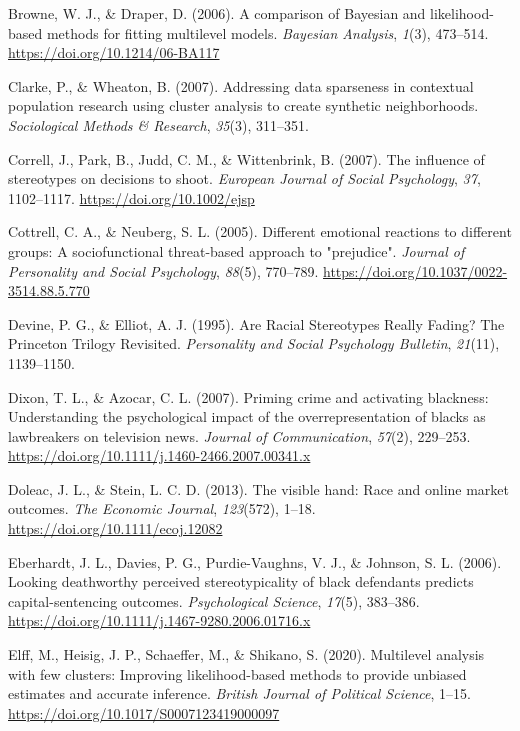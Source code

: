\documentclass[
  english,
  man]{apa6}
\begin{document}
\leavevmode\hypertarget{ref-Browne2006}{}%
Browne, W. J., \& Draper, D. (2006). A comparison of Bayesian and likelihood-based methods for fitting multilevel models. \emph{Bayesian Analysis}, \emph{1}(3), 473--514. \url{https://doi.org/10.1214/06-BA117}

\leavevmode\hypertarget{ref-Clarke2007}{}%
Clarke, P., \& Wheaton, B. (2007). Addressing data sparseness in contextual population research using cluster analysis to create synthetic neighborhoods. \emph{Sociological Methods \& Research}, \emph{35}(3), 311--351.

\leavevmode\hypertarget{ref-Correll2007}{}%
Correll, J., Park, B., Judd, C. M., \& Wittenbrink, B. (2007). The influence of stereotypes on decisions to shoot. \emph{European Journal of Social Psychology}, \emph{37}, 1102--1117. \url{https://doi.org/10.1002/ejsp}

\leavevmode\hypertarget{ref-Cottrell2005}{}%
Cottrell, C. A., \& Neuberg, S. L. (2005). Different emotional reactions to different groups: A sociofunctional threat-based approach to "prejudice". \emph{Journal of Personality and Social Psychology}, \emph{88}(5), 770--789. \url{https://doi.org/10.1037/0022-3514.88.5.770}

\leavevmode\hypertarget{ref-Devine1995}{}%
Devine, P. G., \& Elliot, A. J. (1995). Are Racial Stereotypes Really Fading? The Princeton Trilogy Revisited. \emph{Personality and Social Psychology Bulletin}, \emph{21}(11), 1139--1150.

\leavevmode\hypertarget{ref-Dixon2007}{}%
Dixon, T. L., \& Azocar, C. L. (2007). Priming crime and activating blackness: Understanding the psychological impact of the overrepresentation of blacks as lawbreakers on television news. \emph{Journal of Communication}, \emph{57}(2), 229--253. \url{https://doi.org/10.1111/j.1460-2466.2007.00341.x}

\leavevmode\hypertarget{ref-Doleac2013}{}%
Doleac, J. L., \& Stein, L. C. D. (2013). The visible hand: Race and online market outcomes. \emph{The Economic Journal}, \emph{123}(572), 1--18. \url{https://doi.org/10.1111/ecoj.12082}

\leavevmode\hypertarget{ref-Eberhardt2006}{}%
Eberhardt, J. L., Davies, P. G., Purdie-Vaughns, V. J., \& Johnson, S. L. (2006). Looking deathworthy perceived stereotypicality of black defendants predicts capital-sentencing outcomes. \emph{Psychological Science}, \emph{17}(5), 383--386. \url{https://doi.org/10.1111/j.1467-9280.2006.01716.x}

\leavevmode\hypertarget{ref-Elff2020}{}%
Elff, M., Heisig, J. P., Schaeffer, M., \& Shikano, S. (2020). Multilevel analysis with few clusters: Improving likelihood-based methods to provide unbiased estimates and accurate inference. \emph{British Journal of Political Science}, 1--15. \url{https://doi.org/10.1017/S0007123419000097}
\end{document}
